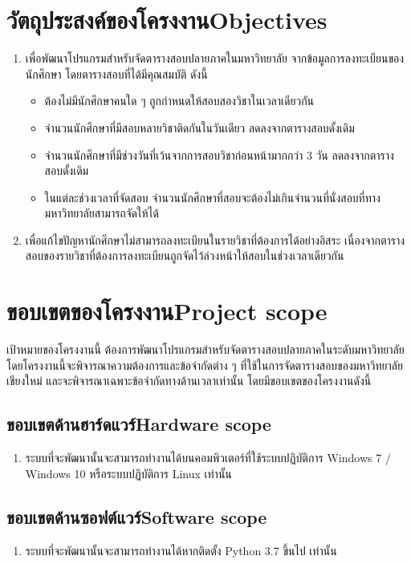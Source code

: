\section{\ifcpe วัตถุประสงค์ของโครงงาน\else Objectives\fi}
\label{sec:Objectives}
\begin{enumerate}
    \item เพื่อพัฒนาโปรแกรมสำหรับจัดตารางสอบปลายภาคในมหาวิทยาลัย จากข้อมูลการลงทะเบียนของนักศึกษา โดยตารางสอบที่ได้มีคุณสมบัติ ดังนี้
    \begin{itemize}
        \item ต้องไม่มีนักศึกษาคนใด ๆ ถูกกำหนดให้สอบสองวิชาในเวลาเดียวกัน
        \item จำนวนนักศึกษาที่มีสอบหลายวิชาติดกันในวันเดียว ลดลงจากตารางสอบดั้งเดิม
        \item จำนวนนักศึกษาที่มีช่วงวันที่เว้นจากการสอบวิชาก่อนหน้ามากกว่า 3 วัน ลดลงจากตารางสอบดั้งเดิม
        \item ในแต่ละช่วงเวลาที่จัดสอบ จำนวนนักศึกษาที่สอบจะต้องไม่เกินจำนวนที่นั่งสอบที่ทางมหาวิทยาลัยสามารถจัดให้ได้
    \end{itemize}
    \item เพื่อแก้ไขปัญหานักศึกษาไม่สามารถลงทะเบียนในรายวิชาที่ต้องการได้อย่างอิสระ เนื่องจากตารางสอบของรายวิชาที่ต้องการลงทะเบียนถูกจัดไว้ล่วงหน้าให้สอบในช่วงเวลาเดียวกัน
\end{enumerate}

\section{\ifcpe ขอบเขตของโครงงาน\else Project scope\fi}
เป้าหมายของโครงงานนี้ ต้องการพัฒนาโปรแกรมสำหรับจัดตารางสอบปลายภาคในระดับมหาวิทยาลัย
โดยโครงงานนี้จะพิจารณาความต้องการและข้อจำกัดต่าง ๆ ที่ใช้ในการจัดตารางสอบของมหาวิทยาลัยเชียงใหม่
และจะพิจารณาเฉพาะข้อจำกัดทางด้านเวลาเท่านั้น โดยมีขอบเขตของโครงงานดังนี้ 
\subsection{\ifcpe ขอบเขตด้านฮาร์ดแวร์\else Hardware scope\fi}
\begin{enumerate}
    \item ระบบที่จะพัฒนานั้นจะสามารถทำงานได้บนคอมพิวเตอร์ที่ใช้ระบบปฏิบัติการ Windows 7 / Windows 10 หรือระบบปฏิบัติการ Linux เท่านั้น
\end{enumerate}
\subsection{\ifcpe ขอบเขตด้านซอฟต์แวร์\else Software scope\fi}
\begin{enumerate}
    \item ระบบที่จะพัฒนานั้นจะสามารถทำงานได้หากติดตั้ง Python 3.7 ขึ้นไป เท่านั้น 
\end{enumerate}
